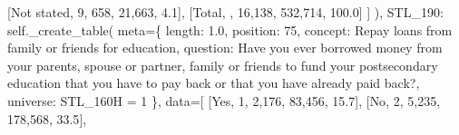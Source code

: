 \documentclass[
  11pt,
  a4paper,
]{article}
\newenvironment{Shaded}{\begin{snugshade}}{\end{snugshade}}
\newcommand{\NormalTok}[1]{\textcolor[rgb]{0.00,0.23,0.31}{#1}}
\newcommand{\OperatorTok}[1]{\textcolor[rgb]{0.37,0.37,0.37}{#1}}
\newcommand{\StringTok}[1]{\textcolor[rgb]{0.13,0.47,0.30}{#1}}
\newcommand{\VariableTok}[1]{\textcolor[rgb]{0.07,0.07,0.07}{#1}}
\begin{document}
\begin{Shaded}
\begin{Highlighting}[]
\NormalTok{                    [}\StringTok{\textquotesingle{}Not stated\textquotesingle{}}\NormalTok{, }\StringTok{\textquotesingle{}9\textquotesingle{}}\NormalTok{, }\StringTok{\textquotesingle{}658\textquotesingle{}}\NormalTok{, }\StringTok{\textquotesingle{}21,663\textquotesingle{}}\NormalTok{, }\StringTok{\textquotesingle{}4.1\textquotesingle{}}\NormalTok{],}
\NormalTok{                    [}\StringTok{\textquotesingle{}Total\textquotesingle{}}\NormalTok{, }\StringTok{\textquotesingle{}\textquotesingle{}}\NormalTok{, }\StringTok{\textquotesingle{}16,138\textquotesingle{}}\NormalTok{, }\StringTok{\textquotesingle{}532,714\textquotesingle{}}\NormalTok{, }\StringTok{\textquotesingle{}100.0\textquotesingle{}}\NormalTok{]}
\NormalTok{                ]}
\NormalTok{            ),}
            \StringTok{\textquotesingle{}STL\_190\textquotesingle{}}\NormalTok{: }\VariableTok{self}\NormalTok{.\_create\_table(}
\NormalTok{                meta}\OperatorTok{=}\NormalTok{\{}
                    \StringTok{\textquotesingle{}length\textquotesingle{}}\NormalTok{: }\StringTok{\textquotesingle{}1.0\textquotesingle{}}\NormalTok{, }\StringTok{\textquotesingle{}position\textquotesingle{}}\NormalTok{: }\StringTok{\textquotesingle{}75\textquotesingle{}}\NormalTok{,}
                    \StringTok{\textquotesingle{}concept\textquotesingle{}}\NormalTok{: }\StringTok{\textquotesingle{}Repay loans from family or friends for education\textquotesingle{}}\NormalTok{,}
                    \StringTok{\textquotesingle{}question\textquotesingle{}}\NormalTok{: }\StringTok{\textquotesingle{}Have you ever borrowed money from your parents, spouse or partner, family or friends to fund your postsecondary education that you have to pay back or that you have already paid back?\textquotesingle{}}\NormalTok{,}
                    \StringTok{\textquotesingle{}universe\textquotesingle{}}\NormalTok{: }\StringTok{\textquotesingle{}STL\_160H = 1\textquotesingle{}}
\NormalTok{                \},}
\NormalTok{                data}\OperatorTok{=}\NormalTok{[}
\NormalTok{                    [}\StringTok{\textquotesingle{}Yes\textquotesingle{}}\NormalTok{, }\StringTok{\textquotesingle{}1\textquotesingle{}}\NormalTok{, }\StringTok{\textquotesingle{}2,176\textquotesingle{}}\NormalTok{, }\StringTok{\textquotesingle{}83,456\textquotesingle{}}\NormalTok{, }\StringTok{\textquotesingle{}15.7\textquotesingle{}}\NormalTok{],}
\NormalTok{                    [}\StringTok{\textquotesingle{}No\textquotesingle{}}\NormalTok{, }\StringTok{\textquotesingle{}2\textquotesingle{}}\NormalTok{, }\StringTok{\textquotesingle{}5,235\textquotesingle{}}\NormalTok{, }\StringTok{\textquotesingle{}178,568\textquotesingle{}}\NormalTok{, }\StringTok{\textquotesingle{}33.5\textquotesingle{}}\NormalTok{],}

\end{Highlighting}
\end{Shaded}
\end{document}
